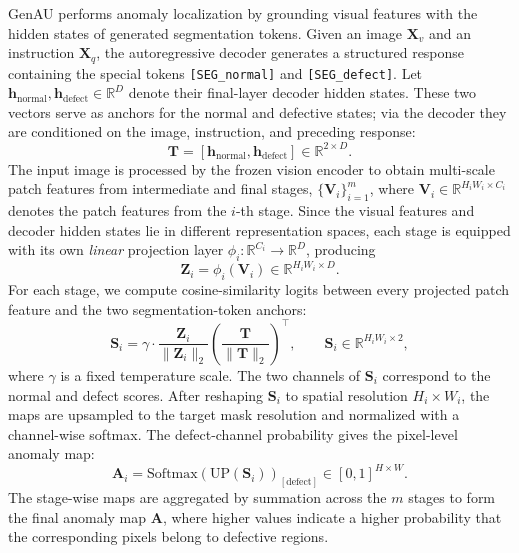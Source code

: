 GenAU performs anomaly localization by grounding visual features with the hidden states of generated segmentation tokens. Given an image $\mathbf{X}_v$ and an instruction $\mathbf{X}_q$, the autoregressive decoder generates a structured response containing the special tokens \texttt{[SEG\_normal]} and \texttt{[SEG\_defect]}. Let $\mathbf{h}_{\mathrm{normal}}, \mathbf{h}_{\mathrm{defect}}\in\mathbb{R}^{D}$ denote their final-layer decoder hidden states. These two vectors serve as anchors for the normal and defective states; via the decoder they are conditioned on the image, instruction, and preceding response:
\begin{equation}
    \mathbf{T}
    =
    [\mathbf{h}_{\mathrm{normal}}, \mathbf{h}_{\mathrm{defect}}]
    \in \mathbb{R}^{2\times D}.
\end{equation}
The input image is processed by the frozen vision encoder to obtain multi-scale patch features from intermediate and final stages,
\(\{\mathbf{V}_i\}_{i=1}^{m}\), where
\(\mathbf{V}_i\in\mathbb{R}^{H_iW_i\times C_i}\) denotes the patch features from the \(i\)-th stage. Since the visual features and decoder hidden states lie in different representation spaces, each stage is equipped with its own \emph{linear} projection layer
\(\phi_i:\mathbb{R}^{C_i}\rightarrow\mathbb{R}^{D}\), producing
\begin{equation}
    \mathbf{Z}_i
    =
    \phi_i(\mathbf{V}_i)
    \in
    \mathbb{R}^{H_iW_i\times D}.
\end{equation}
For each stage, we compute cosine-similarity logits between every projected patch feature and the two segmentation-token anchors:
\begin{equation}
    \mathbf{S}_i
    =
    \gamma
    \cdot
    \frac{\mathbf{Z}_i}{\|\mathbf{Z}_i\|_2}
    \left(
    \frac{\mathbf{T}}{\|\mathbf{T}\|_2}
    \right)^{\top},
    \qquad
    \mathbf{S}_i\in\mathbb{R}^{H_iW_i\times 2},
\end{equation}
where \(\gamma\) is a fixed temperature scale. The two channels of \(\mathbf{S}_i\) correspond to the normal and defect scores. After reshaping \(\mathbf{S}_i\) to spatial resolution \(H_i\times W_i\), the maps are upsampled to the target mask resolution and normalized with a channel-wise softmax. The defect-channel probability gives the pixel-level anomaly map:
\begin{equation}
    \mathbf{A}_i
    =
    \mathrm{Softmax}(\mathrm{UP}(\mathbf{S}_i))_{[\mathrm{defect}]}
    \in
    [0,1]^{H\times W}.
\end{equation}
The stage-wise maps are aggregated by summation across the $m$ stages to form the final anomaly map $\mathbf{A}$, where higher values indicate a higher probability that the corresponding pixels belong to defective regions.

